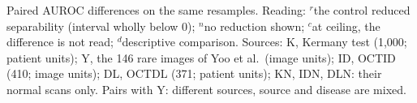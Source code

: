 Paired AUROC differences on the same resamples. Reading: $^{r}$the control reduced separability (interval wholly below 0); $^{n}$no reduction shown; $^{c}$at ceiling, the difference is not read; $^{d}$descriptive comparison. Sources: K, Kermany test (1,000; patient units); Y, the 146 rare images of Yoo et al.\ (image units); ID, OCTID (410; image units); DL, OCTDL (371; patient units); KN, IDN, DLN: their normal scans only. Pairs with Y: different sources, source and disease are mixed.
